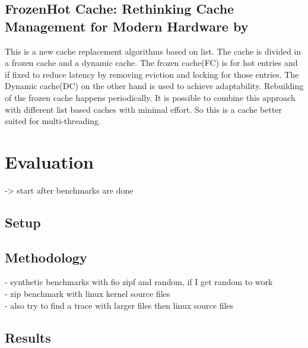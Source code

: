 \documentclass[
	12pt,
	a4paper,
	abstract,
	bibliography=totoc,
	chapterprefix,
	headings=openright,
	numbers=endperiod,
	parskip=half,
	twoside,
]{scrreprt}
\begin{document}
\section*{FrozenHot Cache: Rethinking Cache Management for Modern Hardware by \cite{qiu2023frozenhot}}

This is a new cache replacement algorithms based on list.
The cache is divided in a frozen cache and a dynamic cache.
The frozen cache(FC) is for hot entries and if fixed to reduce latency by removing eviction and locking for those entries. 
The Dynamic cache(DC) on the other hand is used to achieve adaptability.
Rebuilding of the frozen cache happens periodically.
It is possible to combine this approach with different list based caches with minimal effort.
So this is a cache better suited for multi-threading.
 


\chapter{Evaluation}
\label{cha:evaluation}



-> start after benchmarks are done

\section{Setup}

\section{Methodology}
- synthetic benchmarks with fio zipf and random, if I get random to work\\
- zip benchmark with linux kernel source files\\
- also try to find a trace with larger files then linux source files\\

\section{Results}
\end{document}
